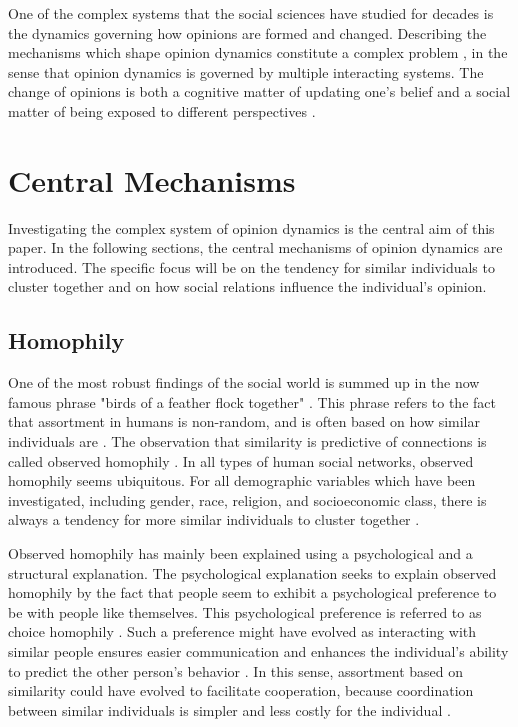 \documentclass[11pt]{article}
\begin{document}
One of the complex systems that the social sciences have studied for decades is the dynamics governing how opinions are formed and changed. Describing the mechanisms which shape opinion dynamics constitute a complex problem \cite{mas2019challenges}, in the sense that opinion dynamics is governed by multiple interacting systems. 
The change of opinions is both a cognitive matter of updating one’s belief and a social matter of being exposed to different perspectives \cite{flache_models_2017,friedkin_social_1990,spears_social_2021}. 

\section{Central Mechanisms}
Investigating the complex system of opinion dynamics is the central aim of this paper. In the following sections, the central mechanisms of opinion dynamics are introduced. The specific focus will be on the tendency for similar individuals to cluster together and on how social relations influence the individual's opinion. 

\subsection{Homophily}
One of the most robust findings of the social world is summed up in the now famous phrase "birds of a feather flock together" \cite{mcpherson_birds_2001}. This phrase refers to the fact that assortment in humans is non-random, and is often based on how similar individuals are \cite{asikainen_cumulative_2020,crandall_feedback_2008,mcpherson_birds_2001}. The observation that similarity is predictive of connections is called observed homophily \cite{mcpherson_birds_2001,kossinets_origins_2009}. In all types of human social networks, observed homophily seems ubiquitous.
For all demographic variables which have been investigated, including gender, race, religion, and socioeconomic class, there is always a tendency for more similar individuals to cluster together \cite{asikainen_cumulative_2020,mcpherson_birds_2001, taylor_exploring_2018}. 

\noindent Observed homophily has mainly been explained using a psychological and a structural explanation. The psychological explanation seeks to explain observed homophily by the fact that people seem to exhibit a psychological preference to be with people like themselves. This psychological preference is referred to as choice homophily \cite{asikainen_cumulative_2020,mcpherson_birds_2001,winter_you_2020}.
Such a preference might have evolved as interacting with similar people ensures easier communication and enhances the individual’s ability to predict the other person’s behavior \cite{kossinets_origins_2009,winter_you_2020}. In this sense, assortment based on similarity could have evolved to facilitate cooperation, because coordination between similar individuals is simpler and less costly for the individual \cite{winter_you_2020,carter2015phenotypic, smaldino2019social}. 
\end{document}

